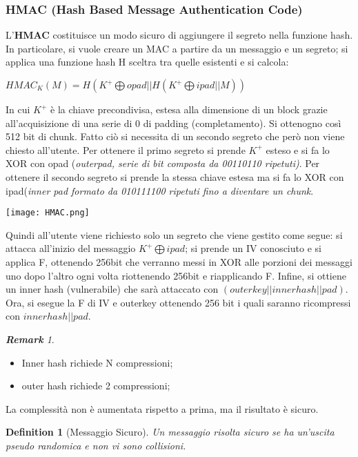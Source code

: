 \documentclass{article}
\newtheorem{definition}{Definition}[section]
\theoremstyle{remark}
\newtheorem*{remark}{\textbf{Remark}}
\begin{document}
\subsubsection{HMAC (Hash Based Message Authentication Code)}
L'\textbf{HMAC} costituisce un modo sicuro di aggiungere il segreto nella funzione hash. In particolare, si vuole creare un MAC a partire da un messaggio e un segreto; si applica una funzione hash H sceltra tra quelle esistenti e si calcola:
\begin{center}
    $HMAC_K(M)=H(K^{+}\bigoplus opad||H(K^{+} \bigoplus ipad ||M))$
\end{center}
In cui $K^{+}$ è la chiave precondivisa, estesa alla dimensione di un block grazie all'acquisizione di una serie di 0 di padding (completamento). Si ottenogno così 512 bit di chunk. Fatto ciò si necessita di un secondo segreto che però non viene chiesto all'utente. 
Per ottenere il primo segreto si prende $K^{+}$ esteso e si fa lo XOR con opad (\emph{outerpad, serie di bit composta da 00110110 ripetuti)}.
Per ottenere il secondo segreto si prende la stessa chiave estesa ma si fa lo XOR con ipad(\emph{inner pad formato da 010111100 ripetuti fino a diventare un chunk}.
\begin{center}
    \texttt{[image: HMAC.png]}
\end{center}
Quindi all'utente viene richiesto solo un segreto che viene gestito come segue: si attacca all'inizio del messaggio $K^{+} \bigoplus ipad$; si prende un IV conosciuto e si applica F, ottenendo 256bit che verranno messi in XOR alle porzioni dei messaggi uno dopo l'altro ogni volta riottenendo 256bit e riapplicando F.
Infine, si ottiene un inner hash (vulnerabile) che sarà attaccato con $(outerkey||inner hash|| pad)$. Ora, si esegue la F di IV e outerkey ottenendo 256 bit i quali saranno ricompressi con $inner hash||pad$.
\begin{remark}
\begin{itemize}
    \item Inner hash richiede N compressioni;
    \item outer hash richiede 2 compressioni;
\end{itemize}
La complessità non è aumentata rispetto a prima, ma il risultato è sicuro.
\end{remark}
\begin{definition}[Messaggio Sicuro]
Un messaggio risolta sicuro se ha un'uscita pseudo randomica e non vi sono collisioni.
\end{definition}
\end{document}
